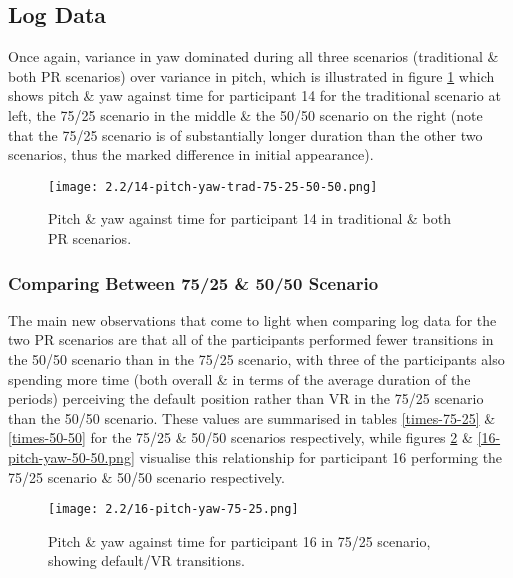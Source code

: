 
\subsection{Log Data}

Once again, variance in yaw dominated during all three scenarios (traditional \& both PR scenarios) over variance in pitch, which is illustrated in figure \ref{14-pitch-yaw-trad-75-25-50-50.png} which shows pitch \& yaw against time for participant 14 for the traditional scenario at left, the 75/25 scenario in the middle \& the 50/50 scenario on the right (note that the 75/25 scenario is of substantially longer duration than the other two scenarios, thus the marked difference in initial appearance).

\begin{figure}[h]
	\begin{center}
	\texttt{[image: 2.2/14-pitch-yaw-trad-75-25-50-50.png]}
	\caption{Pitch \& yaw against time for participant 14 in traditional \& both PR scenarios.}
	\label{14-pitch-yaw-trad-75-25-50-50.png}
	\end{center}
\end{figure}


\subsubsection{Comparing Between 75/25 \& 50/50 Scenario}

The main new observations that come to light when comparing log data for the two PR scenarios are that all of the participants performed fewer transitions in the 50/50 scenario than in the 75/25 scenario, with three of the participants also spending more time (both overall \& in terms of the average duration of the periods) perceiving the default position rather than VR in the 75/25 scenario than the 50/50 scenario. These values are summarised in tables \ref{times-75-25} \& \ref{times-50-50} for the 75/25 \& 50/50 scenarios respectively, while figures \ref{16-pitch-yaw-75-25.png} \& \ref{16-pitch-yaw-50-50.png} visualise this relationship for participant 16 performing the 75/25 scenario \& 50/50 scenario respectively.

\begin{figure}[h]
	\begin{center}
	\texttt{[image: 2.2/16-pitch-yaw-75-25.png]}
	\caption{Pitch \& yaw against time for participant 16 in 75/25 scenario, showing default/VR transitions.}
	\label{16-pitch-yaw-75-25.png}
	\end{center}
\end{figure}

